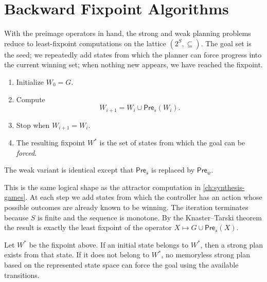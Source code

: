 \section{Backward Fixpoint Algorithms}
\label{sec:planning-fixpoints}

With the preimage operators in hand, the strong and weak planning
problems reduce to least-fixpoint computations on the lattice
$(2^S,\subseteq)$.  The goal set is the seed; we repeatedly add states
from which the planner can force progress into the current winning set;
when nothing new appears, we have reached the fixpoint.

\begin{formaldetails}
\begin{enumerate}[label=\textbf{Step \arabic*.}, leftmargin=2cm]
  \item Initialize $W_0=G$.
  \item Compute
        \[
          W_{i+1}=W_i\cup \mathsf{Pre}_s(W_i).
        \]
  \item Stop when $W_{i+1}=W_i$.
  \item The resulting fixpoint $W^\ast$ is the set of states from which
        the goal can be \emph{forced}.
\end{enumerate}
The weak variant is identical except that $\mathsf{Pre}_s$ is replaced
by $\mathsf{Pre}_w$.
\end{formaldetails}

This is the same logical shape as the attractor computation in
\cref{ch:synthesis-games}.  At each step we add states from which the
controller has an action whose possible outcomes are already known to
be winning.  The iteration terminates because $S$ is finite and the
sequence is monotone.  By the Knaster--Tarski theorem the result is
exactly the least fixpoint of the operator $X\mapsto G\cup
\mathsf{Pre}_s(X)$.

\begin{proposition}
\label{prop:strong-planning-fixpoint}
Let $W^\ast$ be the fixpoint above.  If an initial state belongs to
$W^\ast$, then a strong plan exists from that state.  If it does not
belong to $W^\ast$, no memoryless strong plan based on the represented
state space can force the goal using the available transitions.
\end{proposition}

